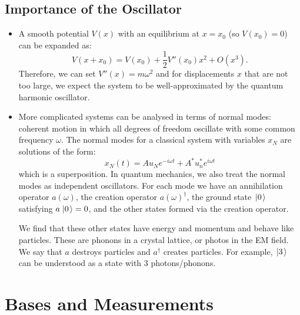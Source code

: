 \documentclass[../Main.tex]{subfiles}
\begin{document}
\subsection{Importance of the Oscillator}
\begin{itemize}
    \item A smooth potential $V(x)$ with an equilibrium at $x = x_0$ (so $V
    (x_0) = 0$) can be expanded as:
        \begin{equation*}
            V(x + x_0) = V(x_0) + \frac12 V''(x_0) x^2 + O(x^3).
        \end{equation*}
        Therefore, we can set $V''(x) = m\omega^2$ and for displacements $x$ that are not too large, we expect the system to be well-approximated by the quantum harmonic oscillator.
    \item More complicated systems can be analysed in terms of normal modes: coherent motion in which all degrees of freedom oscillate with some common frequency $\omega$. The normal modes for a classical system with variables $x_N$ are solutions of the form:
        \begin{equation*}
            x_N(t) = Au_Ne^{-i\omega t} + A^* u_n^* e^{i\omega t}
        \end{equation*}
        which is a superposition. In quantum mechanics, we also treat the normal modes as independent oscillators. For each mode we have an annihilation operator $a(\omega)$, the creation operator $a(\omega)^\dagger$, the ground state $\left.\left|0\right.\right\rangle$ satisfying $a\left.\left|0\right.\right\rangle = 0$, and the other states formed via the creation operator.
        
        We find that these other states have energy and momentum and behave like particles. These are phonons in a crystal lattice, or photos in the EM field. We say that $a$ destroys particles and $a^\dagger$ creates particles. For example, $\left.\left|3\right.\right\rangle$ can be understood as a state with $3$ photons/phonons.
\end{itemize}
\section{Bases and Measurements}
\end{document}
